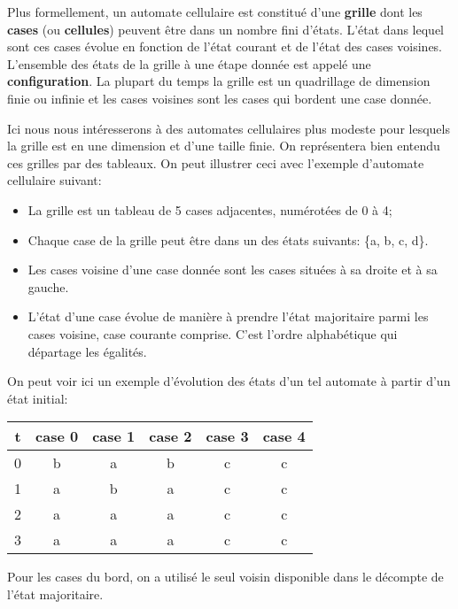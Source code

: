 \documentclass[11pt]{article}
\begin{document}
Plus formellement, un automate cellulaire est constitué d'une \textbf{grille} dont les \textbf{cases} (ou \textbf{cellules}) peuvent être dans un nombre fini d'états. L'état dans lequel sont ces cases évolue en fonction de l'état courant et de l'état des cases voisines.
L'ensemble des états de la grille à une étape donnée est appelé une \textbf{configuration}.
La plupart du temps la grille est un quadrillage de dimension finie ou infinie et les cases voisines sont les cases qui bordent une case donnée.

Ici nous nous intéresserons à des automates cellulaires plus modeste pour lesquels la grille est en une dimension et d'une taille finie. On représentera bien entendu ces grilles par des tableaux.
On peut illustrer ceci avec l'exemple d'automate cellulaire suivant:
\begin{itemize}
\item La grille est un tableau de 5 cases adjacentes, numérotées de 0 à 4;
\item Chaque case de la grille peut être dans un des états suivants: \{a, b, c, d\}.
\item Les cases voisine d'une case donnée sont les cases situées à sa droite et à sa gauche.
\item L'état d'une case évolue de manière à prendre l'état majoritaire parmi les cases voisine, case courante comprise. C'est l'ordre alphabétique qui départage les égalités.
\end{itemize}

On peut voir ici un exemple d'évolution des états d'un tel automate à partir d'un état initial:
\begin{center}
\begin{tabular}{|c|c|c|c|c|c|}
\hline
t & case 0 & case 1 & case 2 & case 3 & case 4\\
\hline
0 & b & a & b & c & c\\
1 & a & b & a & c & c\\
2 & a & a & a & c & c\\
3 & a & a & a & c & c\\
\hline
\end{tabular}
\end{center}

Pour les cases du bord, on a utilisé le seul voisin disponible dans le décompte de l'état majoritaire.
\end{document}
